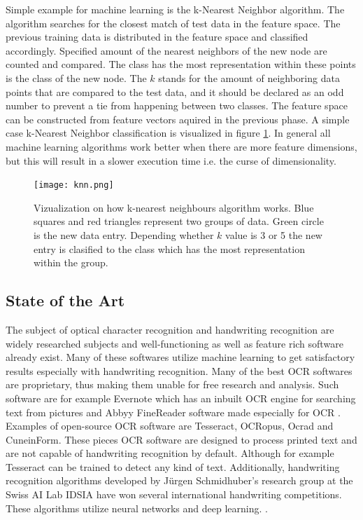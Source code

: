 \documentclass{article}
\begin{document}
          Simple example for machine learning is the k-Nearest Neighbor algorithm. The algorithm searches for the closest match of test data in the feature space. The previous training data is distributed in the feature space and classified accordingly. Specified amount of the nearest neighbors of the new node are counted and compared. The class has the most representation within these points is the class of the new node. The $k$ stands for the amount of neighboring data points that are compared to the test data, and it should be declared as an odd number to prevent a tie from happening between two classes. The feature space can be constructed from feature vectors aquired in the previous phase. A simple case k-Nearest Neighbor classification is visualized in figure \ref{fig:knn}. In general all machine learning algorithms work better when there are more feature dimensions, but this will result in a slower execution time i.e. the curse of dimensionality.\cite{Beyer}

          \begin{figure}[!ht]
            \centering
            \texttt{[image: knn.png]}
            \caption{Vizualization on how k-nearest neighbours algorithm works. Blue squares
                      and red triangles represent two groups of data. Green circle is the new
                      data entry. Depending whether $k$ value is 3 or 5 the new entry is clasified
                      to the class which has the most representation within the group.\label{fig:knn} }
          \end{figure}

    \subsection{State of the Art}
      The subject of optical character recognition and handwriting recognition are widely researched subjects and well-functioning as well as feature rich software already exist. Many of these softwares utilize machine learning to get satisfactory results especially with handwriting recognition. Many of the best OCR softwares are proprietary, thus making them unable for free research and analysis. Such software are for example Evernote which has an inbuilt OCR engine for searching text from pictures \cite{Kelly} and Abbyy FineReader software made especially for OCR \cite{ABBYY}. Examples of open-source OCR software are Tesseract\cite{Smith2007a}, OCRopus\cite{Breuel2007}, Ocrad\cite{FreeSoftwareFoundation2016} and CuneinForm\cite{CognitiveTechnologies2016}. These pieces OCR software are designed to process printed text and are not capable of handwriting recognition by default. Although for example Tesseract can be trained to detect any kind of text.\cite{Smith2007a} Additionally, handwriting recognition algorithms developed by J{\"u}rgen Schmidhuber's research group at the Swiss AI Lab IDSIA have won several international handwriting competitions. These algorithms utilize neural networks and deep learning. \cite{Angelica}.
\end{document}
